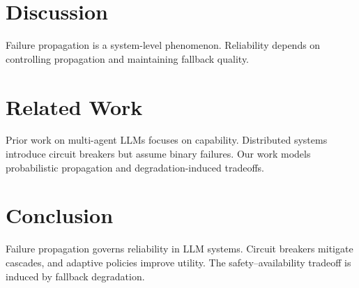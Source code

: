 \documentclass[11pt]{article}
\begin{document}
\section{Discussion}

Failure propagation is a system-level phenomenon. Reliability depends on controlling propagation and maintaining fallback quality.

\section{Related Work}

Prior work on multi-agent LLMs focuses on capability. Distributed systems introduce circuit breakers but assume binary failures. Our work models probabilistic propagation and degradation-induced tradeoffs.

\section{Conclusion}

Failure propagation governs reliability in LLM systems. Circuit breakers mitigate cascades, and adaptive policies improve utility. The safety--availability tradeoff is induced by fallback degradation.



\end{document}
